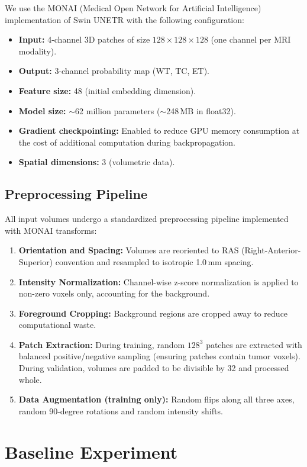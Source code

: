 \documentclass{article}
\begin{document}
We use the MONAI (Medical Open Network for Artificial Intelligence) implementation of Swin UNETR with the following configuration:
\begin{itemize}
    \item \textbf{Input:} 4-channel 3D patches of size $128 \times 128 \times 128$ (one channel per MRI modality).
    \item \textbf{Output:} 3-channel probability map (WT, TC, ET).
    \item \textbf{Feature size:} 48 (initial embedding dimension).
    \item \textbf{Model size:} $\sim$62 million parameters ($\sim$248\,MB in float32).
    \item \textbf{Gradient checkpointing:} Enabled to reduce GPU memory consumption at the cost of additional computation during backpropagation.
    \item \textbf{Spatial dimensions:} 3 (volumetric data).
\end{itemize}

\subsection{Preprocessing Pipeline}

All input volumes undergo a standardized preprocessing pipeline implemented with MONAI transforms:
\begin{enumerate}
    \item \textbf{Orientation and Spacing:} Volumes are reoriented to RAS (Right-Anterior-Superior) convention and resampled to isotropic 1.0\,mm spacing.
    \item \textbf{Intensity Normalization:} Channel-wise z-score normalization is applied to non-zero voxels only, accounting for the background.
    \item \textbf{Foreground Cropping:} Background regions are cropped away to reduce computational waste.
    \item \textbf{Patch Extraction:} During training, random $128^3$ patches are extracted with balanced positive/negative sampling (ensuring patches contain tumor voxels). During validation, volumes are padded to be divisible by 32 and processed whole.
    \item \textbf{Data Augmentation (training only):} Random flips along all three axes, random 90-degree rotations and random intensity shifts.
\end{enumerate}

\section{Baseline Experiment}
\label{sec:baseline}
\end{document}
